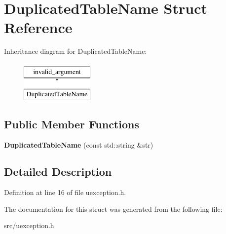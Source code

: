 \hypertarget{struct_duplicated_table_name}{}\section{Duplicated\+Table\+Name Struct Reference}
\label{struct_duplicated_table_name}
Inheritance diagram for Duplicated\+Table\+Name\+:\begin{figure}[H]
\begin{center}
\leavevmode
\includegraphics[height=2.000000cm]{struct_duplicated_table_name}
\end{center}
\end{figure}
\subsection*{Public Member Functions}
\begin{DoxyCompactItemize}
\item 
\mbox{\label{struct_duplicated_table_name_ae19eda8ab536d93718c7d471a50d48b6}} 
{\bfseries Duplicated\+Table\+Name} (const std\+::string \&str)
\end{DoxyCompactItemize}


\subsection{Detailed Description}


Definition at line 16 of file uexception.\+h.



The documentation for this struct was generated from the following file\+:\begin{DoxyCompactItemize}
\item 
src/uexception.\+h\end{DoxyCompactItemize}

